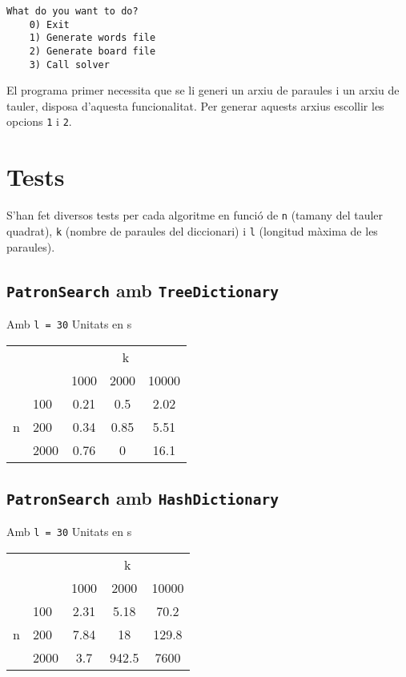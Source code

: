 ﻿\documentclass{article}
\begin{document}
\begin{lstlisting}[frame=single]
	What do you want to do?
	0) Exit
	1) Generate words file
	2) Generate board file
	3) Call solver
\end{lstlisting}

El programa primer necessita que se li generi un arxiu de paraules i un arxiu de tauler, disposa d'aquesta funcionalitat. Per generar aquests arxius escollir les opcions \verb|1| i \verb|2|.

\section{Tests}

S'han fet diversos tests per cada algoritme en funció de \verb|n| (tamany del tauler quadrat), \verb|k| (nombre de paraules del diccionari) i \verb|l| (longitud màxima de les paraules).

\subsection{\texttt{PatronSearch} amb \texttt{TreeDictionary}}

Amb \verb|l = 30|
Unitats en s

\begin{tabular}{cl||c|c|c}
	\multicolumn{2}{c}{ } & \multicolumn{3}{c}{k} \\
	 & & 1000 & 2000 & 10000 \\
	\cline{2-5}
	\multirow{3}{*}{n} 
	& 100 & 0.21 & 0.5 & 2.02 \\
	& 200 & 0.34 & 0.85 & 5.51 \\
	& 2000 & 0.76 & 0 & 16.1 \\
\end{tabular}

\subsection{\texttt{PatronSearch} amb \texttt{HashDictionary}}

Amb \verb|l = 30|
Unitats en s

\begin{tabular}{cl||c|c|c}
	\multicolumn{2}{c}{ } & \multicolumn{3}{c}{k} \\
	& & 1000 & 2000 & 10000 \\
	\cline{2-5}
	\multirow{3}{*}{n} 
	& 100 & 2.31 & 5.18 & 70.2 \\
	& 200 & 7.84 & 18 & 129.8 \\
	& 2000 & 3.7 & 942.5 & 7600 \\
\end{tabular}
\end{document}
